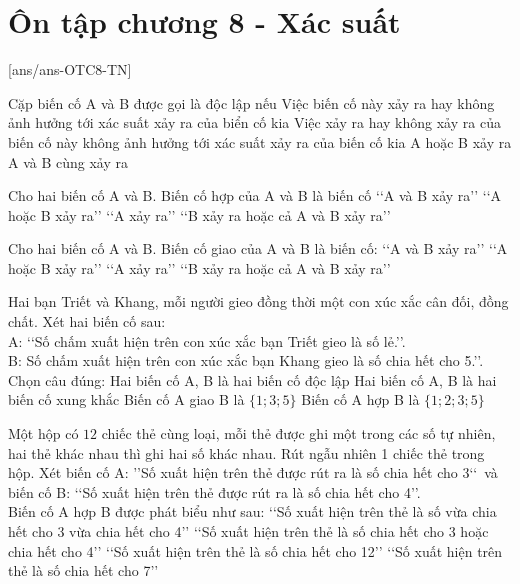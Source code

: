 \section{Ôn tập chương 8 - Xác suất}
[ans/ans-OTC8-TN]
\caulc
\begin{ex}%
	Cặp biến cố A và B được gọi là độc lập nếu
	\choice
	{Việc biến cố này xảy ra hay không ảnh hưởng tới xác suất xảy ra của biển cố kia}
	{\True Việc xảy ra hay không xảy ra của biến cố này không ảnh hưởng tới xác suất xảy ra của biến cố kia}
	{A hoặc B xảy ra}
	{A và B cùng xảy ra}
\end{ex}
\begin{ex}%
	Cho hai biến cố A và B. Biến cố hợp của A và B là biến cố
	\choice
	{\lq\lq A và B xảy ra\rq\rq }
	{\True \lq\lq A hoặc B xảy ra\rq\rq }
	{\lq\lq A xảy ra\rq\rq }
	{\lq\lq B xảy ra hoặc cả A và B xảy ra\rq\rq }
\end{ex}
\begin{ex}%
	Cho hai biến cố A và B. Biến cố giao của A và B là biến cố: 
	\choice
	{\True \lq\lq A và B xảy ra\rq\rq }
	{\lq\lq A hoặc B xảy ra\rq\rq }
	{\lq\lq A xảy ra\rq\rq }
	{\lq\lq B xảy ra hoặc cả A và B xảy ra\rq\rq }
\end{ex}
\begin{ex}%
	Hai bạn Triết và Khang, mỗi người gieo đồng thời một con xúc xắc cân đối, đồng chất. Xét hai biến cố sau:\\
	A: \lq\lq Số chấm xuất hiện trên con xúc xắc bạn Triết gieo là số lẻ.\rq\rq .\\
	B: Số chấm xuất hiện trên con xúc xắc bạn Khang gieo là số chia hết cho 5.\rq\rq .\\
	Chọn câu đúng: 
	\choice
	{\True Hai biến cố A, B là hai biến cố độc lập}
	{Hai biến cố A, B là hai biến cố xung khắc}
	{Biến cố A giao B là $\{1;3;5\}$}
	{Biến cố A hợp B là $\{1;2;3;5\}$}
\end{ex}
\begin{ex}%
	Một hộp có $12$ chiếc thẻ cùng loại, mỗi thẻ được ghi một trong các số tự nhiên, hai thẻ khác nhau thì ghi hai số khác nhau. Rút ngẫu nhiên 1 chiếc thẻ trong hộp. Xét biến cố A: \rq\rq Số xuất hiện trên thẻ được rút ra là số chia hết cho 3\lq\lq\, và biến cố B: \lq\lq Số xuất hiện trên thẻ được rút ra là số chia hết cho 4\rq\rq.\\
	Biến cố A hợp B được phát biểu như sau: 
	\choice
	{\lq\lq Số xuất hiện trên thẻ là số vừa chia hết cho 3 vừa chia hết cho 4\rq\rq }
	{\True \lq\lq Số xuất hiện trên thẻ là số chia hết cho 3 hoặc chia hết cho 4\rq\rq }
	{\lq\lq Số xuất hiện trên thẻ là số chia hết cho 12\rq\rq }
	{\lq\lq Số xuất hiện trên thẻ là số chia hết cho 7\rq\rq }
\end{ex}
